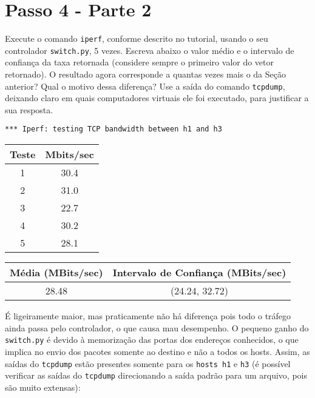 \documentclass[12pt,letterpaper]{article}
\begin{document}
\section{Passo 4 - Parte 2}


Execute o comando \texttt{iperf}, conforme descrito no
tutorial, usando o seu controlador \texttt{switch.py}, 5 vezes.
Escreva abaixo o valor médio e o intervalo de confiança da taxa
retornada (considere sempre o primeiro valor do vetor retornado). O
resultado agora corresponde a quantas vezes mais o da Seção anterior?
Qual o motivo dessa diferença? Use a saída do comando
\texttt{tcpdump}, deixando claro em quais computadores virtuais ele
foi executado, para justificar a sua resposta.

\begin{verbatim}
*** Iperf: testing TCP bandwidth between h1 and h3
\end{verbatim}

\begin{center}
\begin{tabular}{ |c|c| } 
 \hline
 Teste & Mbits/sec \\
 \hline
 1 & 30.4 \\ 
 2 & 31.0 \\ 
 3 & 22.7 \\ 
 4 & 30.2 \\ 
 5 & 28.1 \\ 
 \hline
\end{tabular}
\end{center}

\begin{center}
\begin{tabular}{|c|c|}
 \hline
 Média (MBits/sec) & Intervalo de Confiança (MBits/sec)\\
 \hline
 28.48 & (24.24, 32.72) \\
 \hline
 \end{tabular}
\end{center}

É ligeiramente maior, mas praticamente não há diferença pois todo o tráfego ainda passa pelo controlador, o que causa mau desempenho. O pequeno ganho do  \texttt{switch.py} é devido à memorização das portas dos endereços conhecidos, o que implica no envio dos pacotes somente ao destino e não a todos os hosts. Assim, as saídas do \texttt{tcpdump} estão presentes somente para os \texttt{hosts h1} e \texttt{h3} (é possível verificar as saídas do \texttt{tcpdump} direcionando a saída padrão para um arquivo, pois são muito extensas):
\end{document}
